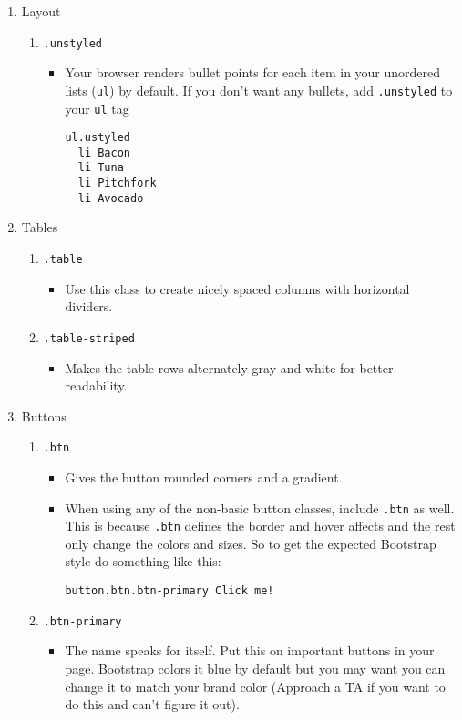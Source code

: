 \documentclass[12pt]{article}
\begin{document}
\begin{enumerate}
\item Layout
\begin{enumerate}
\item \texttt{.unstyled}
\begin{itemize}
\item Your browser renders bullet points for each item in your unordered lists (\texttt{ul}) by default.  If you don't want any bullets, add \texttt{.unstyled} to your \texttt{ul} tag
\begin{lstlisting}[frame=single]
ul.ustyled
  li Bacon 
  li Tuna
  li Pitchfork
  li Avocado
\end{lstlisting}
\end{itemize}
\end{enumerate}

\item Tables
\begin{enumerate}
\item \texttt{.table}
\begin{itemize}
\item Use this class to create nicely spaced columns with horizontal dividers.
\end{itemize}
\item \texttt{.table-striped}
\begin{itemize}
\item Makes the table rows alternately gray and white for better readability.
\end{itemize}
\end{enumerate}

\item Buttons
\begin{enumerate}
\item \texttt{.btn}
\begin{itemize}
\item Gives the button rounded corners and a gradient.
\item When using any of the non-basic button classes, include \texttt{.btn} as well.  This is because \texttt{.btn} defines the border and hover affects and the rest only change the colors and sizes.  So to get the expected Bootstrap style do something like this:
\begin{lstlisting}[frame=single]
button.btn.btn-primary Click me!
\end{lstlisting}
\end{itemize}

\item \texttt{.btn-primary}
\begin{itemize}
\item The name speaks for itself.  Put this on important buttons in your page.  Bootstrap colors it blue by default but you may want you can change it to match your brand color (Approach a TA if you want to do this and can't figure it out).
\end{itemize}


\end{enumerate}
\end{enumerate}
\end{document}
